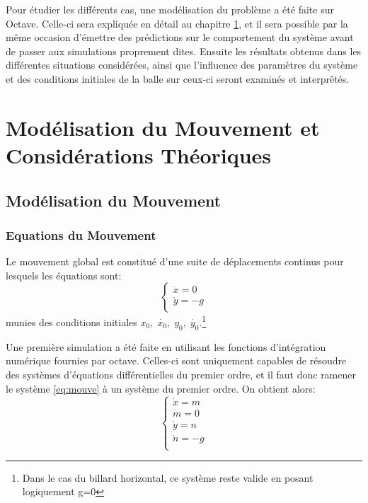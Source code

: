 \documentclass[a4paper]{report}
\begin{document}
Pour étudier les différents cas, une modélisation du problème a été faite sur Octave.  Celle-ci sera expliquée en détail au chapitre \ref{chap:modelisat}, et il sera possible par la même occasion d'émettre des prédictions sur le comportement du système avant de passer aux simulations proprement dites. Ensuite les résultats obtenus dans les différentes situations considérées, ainsi que l'influence des paramètres du système et des conditions initiales de la balle sur ceux-ci seront examinés et interprêtés.


\chapter{Modélisation du Mouvement et Considérations Théoriques}
\label{chap:modelisat}
\section{Modélisation du Mouvement}
\subsection{Equations du Mouvement}
Le mouvement global est constitué d'une suite de déplacements continus pour lesquels les équations sont:
\begin{equation}
\label{eq:mouve}
\begin{cases}
   \ddot{x}=0\\
   \ddot{y}=-g\\
\end{cases}
\end{equation}
munies des conditions initiales \(x_0, \; \dot{x_0}, \; y_0, \; \dot{y_0} \).\footnote{Dans le cas du billard horizontal, ce système reste valide en posant logiquement g=0}

Une première simulation a été faite en utilisant les fonctions d'intégration numérique fournies par octave. Celles-ci sont uniquement capables de résoudre des systèmes d'équations différentielles du premier ordre, et il faut donc ramener le système \ref{eq:mouve} à un système du premier ordre. On obtient alors:
\begin{equation}
\begin{cases}
   \dot{x}=m\\
   \dot{m}=0\\
   \dot{y}=n\\
   \dot{n}=-g\\
\end{cases}
\end{equation}
\end{document}
